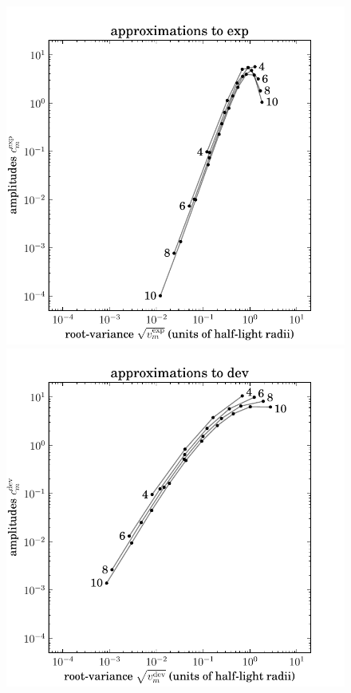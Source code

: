 \documentclass[12pt,pdftex,preprint]{aastex}
\newlength{\figurewidth}
\begin{document}
\clearpage
\begin{figure}
\includegraphics[width=\figurewidth]{mixtures_vs_K_exp}%
\includegraphics[width=\figurewidth]{mixtures_vs_K_dev}\\

\end{figure}
\end{document}
